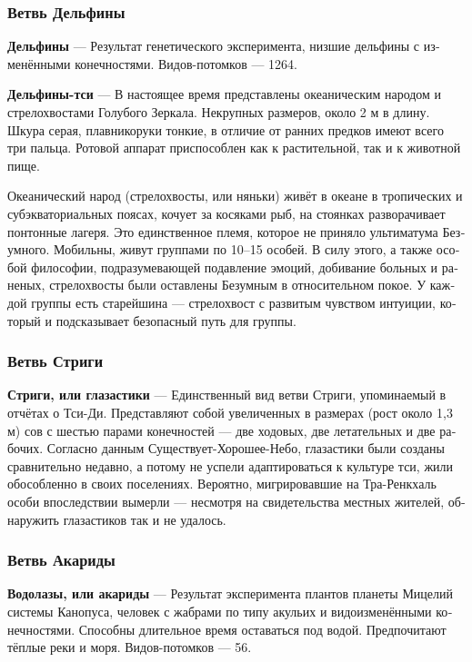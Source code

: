\documentclass[a4paper,12pt,fleqn]{book}\usepackage{polyglossia}\setdefaultlanguage[babelshorthands=true]{russian}\setotherlanguage{english}\defaultfontfeatures{Ligatures=TeX,Mapping=tex-text}\usepackage{xcolor}\newcommand{\ml}[3]{#2}
\newcommand{\asterism}{\vspace{1em}{\centering\Large\bfseries$\ast~\ast~\ast$\par}\vspace{1em}}
\newcommand{\theterm}[3]{\textbf{\hypertarget{#1}{#2}} --- #3}
\begin{document}
\subsubsection{Ветвь Дельфины}

\theterm{delfina-fork}
{Дельфины}
{Результат генетического эксперимента, низшие дельфины с изменёнными конечностями.
Видов-потомков --- 1264.}

\asterism

\theterm{qi-delfina}
{Дельфины-тси}
{В настоящее время представлены океаническим народом и стрелохвостами Голубого Зеркала.
Некрупных размеров, около 2 м в длину.
Шкура серая, плавникоруки тонкие, в отличие от ранних предков имеют всего три пальца.
Ротовой аппарат приспособлен как к растительной, так и к животной пище.

Океанический народ (стрелохвосты, или няньки) живёт в океане в тропических и субэкваториальных поясах, кочует за косяками рыб, на стоянках разворачивает понтонные лагеря.
Это единственное племя, которое не приняло ультиматума Безумного.
Мобильны, живут группами по 10--15 особей.
В силу этого, а также особой философии, подразумевающей подавление эмоций, добивание больных и раненых, стрелохвосты были оставлены Безумным в относительном покое.
У каждой группы есть старейшина --- стрелохвост с развитым чувством интуиции, который и подсказывает безопасный путь для группы.}

\subsubsection{Ветвь Стриги}
 
\theterm{striges-qi}
{Стриги, или глазастики}
{Единственный вид ветви Стриги, упоминаемый в отчётах о Тси-Ди.
Представляют собой увеличенных в размерах (рост около 1,3 м) сов с шестью парами конечностей --- две ходовых, две летательных и две рабочих.
Согласно данным Существует-Хорошее-Небо, глазастики были созданы сравнительно недавно, а потому не успели адаптироваться к культуре тси, жили обособленно в своих поселениях.
Вероятно, мигрировавшие на Тра-Ренкхаль особи впоследствии вымерли --- несмотря на свидетельства местных жителей, обнаружить глазастиков так и не удалось.}

\subsubsection{Ветвь Акариды}

\theterm{acarides-fork}
{Водолазы, или акариды}
{Результат эксперимента плантов планеты Мицелий системы Канопуса, человек с жабрами по типу акульих и видоизменёнными конечностями.
Способны длительное время оставаться под водой.
Предпочитают тёплые реки и моря.
Видов-потомков --- 56.}
\end{document}
